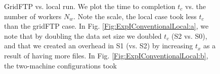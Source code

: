 \documentclass{rspublic}
\begin{document}
\begin{figure}[!ht]
\begin{center}
\caption{GridFTP vs. local run. We plot the time to
completion $t_c$ vs. the number of workers $N_w$. Note the scale, the
local case took less $t_c$ than the gridFTP case. In Fig.
\ref{Fig:ExpIConventionalLocal:a}, we note that by doubling the data set
size we doubled $t_c$ (S2 vs. S0), and that we created an overhead in S1 (vs. S2) by
increasing $t_x$ as a result of having more files. In Fig.
\ref{Fig:ExpIConventionalLocal:b}, the two-machine configurations took
}
\end{center}
\end{figure}
\end{document}
